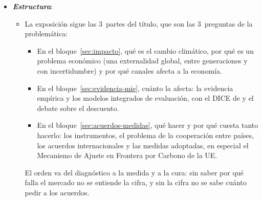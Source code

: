 \documentclass[11pt]{article}
\begin{document}
\begin{itemize}
\item \textbf{\emph{Estructura}}:
  \begin{itemize}
  \item La exposición sigue las 3~partes del título, que son las 3~preguntas de la problemática:
  \begin{itemize}
  \item En el bloque~\ref{sec:impacto}, qué es el cambio climático, por qué es un problema económico (una externalidad global, entre generaciones y con incertidumbre) y por qué canales afecta a la economía.
  \item En el bloque~\ref{sec:evidencia-mie}, cuánto la afecta: la evidencia empírica y los modelos integrados de evaluación, con el DICE de  y el debate sobre el descuento.
  \item En el bloque~\ref{sec:acuerdos-medidas}, qué hacer y por qué cuesta tanto hacerlo: los instrumentos, el problema de la cooperación entre países, los acuerdos internacionales y las medidas adoptadas, en especial el Mecanismo de Ajuste en Frontera por Carbono de la UE.
  \end{itemize}
  El orden va del diagnóstico a la medida y a la cura: sin saber por qué falla el mercado no se entiende la cifra, y sin la cifra no se sabe cuánto pedir a los acuerdos.
  \end{itemize}
\end{itemize}
\end{document}

